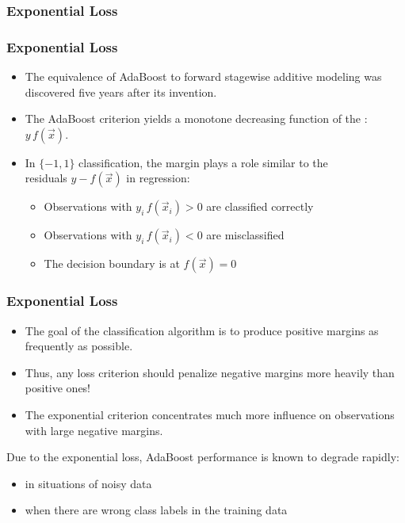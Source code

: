 \begin{frame}
  \frametitle{Exponential Loss \cont}

  \begin{center}
  \end{center}
\end{frame}


\begin{frame}
  \frametitle{Exponential Loss \cont}


  \begin{itemize}
    \item The equivalence of AdaBoost to forward stagewise additive modeling was discovered five years after its invention. %
    \item The AdaBoost criterion yields a monotone decreasing function of the : $y\,f(\vec x)$. \\[.5cm] %
    \item In $\{-1, 1\}$ classification, the margin plays a role similar to the \\
      residuals $y - f(\vec x)$ in regression:
      \begin{itemize}
        \item Observations with $y_i \, f(\vec{x}_i) > 0$ are classified correctly
        \item Observations with $y_i \, f(\vec{x}_i) < 0$ are misclassified 
        \item The decision boundary is at $f(\vec x) = 0$
     \end{itemize}
  \end{itemize}
\end{frame}


\begin{frame}
  \frametitle{Exponential Loss \cont}


  \begin{itemize}
    \item The goal of the classification algorithm is to produce positive margins as frequently as possible. %
    \item Thus, any loss criterion should penalize negative margins more heavily than positive ones! %
    \item The exponential criterion concentrates much more influence on observations with large negative margins.
  \end{itemize}
  \pspread

  Due to the exponential loss, AdaBoost performance is known to degrade rapidly:
  \begin{itemize}
    \item in situations of noisy data
    \item when there are wrong class labels in the training data
  \end{itemize}
\end{frame}


